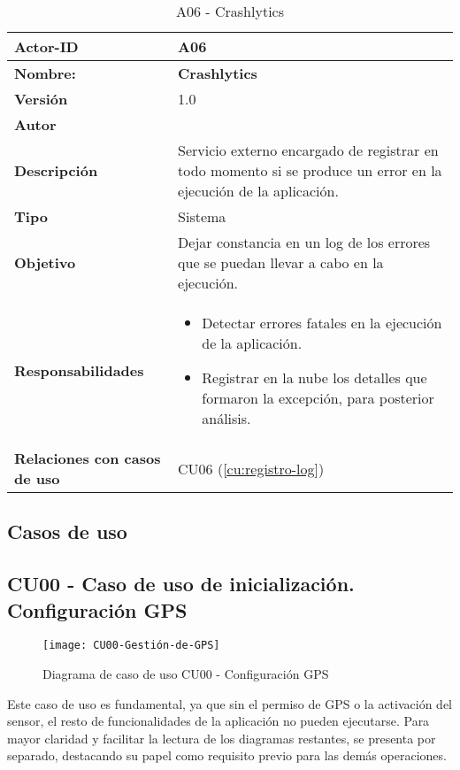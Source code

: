 \begin{table}[H]
	\centering
	\begin{tabularx}{\linewidth}{ p{} p{} }
		\toprule
		\textbf{Actor-ID}    & A06 \\
		\toprule
		\textbf{Nombre: }			  & \textbf{Crashlytics} \\
		\textbf{Versión}              & 1.0    \\
		\textbf{Autor}                & \autor \\
		\textbf{Descripción}          & Servicio externo encargado de registrar en todo momento si se produce un error en la ejecución de la aplicación. \\
		\textbf{Tipo}                 & Sistema \\
		\textbf{Objetivo}             & Dejar constancia en un log de los errores que se puedan llevar a cabo en la ejecución. \\
		\textbf{Responsabilidades}    & 
		\begin{itemize}
			\tightlist
			\item Detectar errores fatales en la ejecución de la aplicación.
			\item Registrar en la nube los detalles que formaron la excepción, para posterior análisis.
		\end{itemize}\\
		\textbf{Relaciones con casos de uso} & CU06 (\ref{cu:registro-log}) \\
		\bottomrule
	\end{tabularx}
	\caption{A06 - Crashlytics}
		\label{actor:crashlytics}
\end{table}

\subsection{Casos de uso}
\label{subsec:casos-uso}

\subsection{CU00 - Caso de uso de inicialización. Configuración GPS}
\begin{figure}[H]
	\centering
	\texttt{[image: CU00-Gestión-de-GPS]}
	\caption{Diagrama de caso de uso CU00 - Configuración GPS}
	\label{fig:CU00-Gestión-de-GPS}
\end{figure}

Este caso de uso es fundamental, ya que sin el permiso de GPS o la activación del sensor, el resto de funcionalidades de la aplicación no pueden ejecutarse. Para mayor claridad y facilitar la lectura de los diagramas restantes, se presenta por separado, destacando su papel como requisito previo para las demás operaciones.

